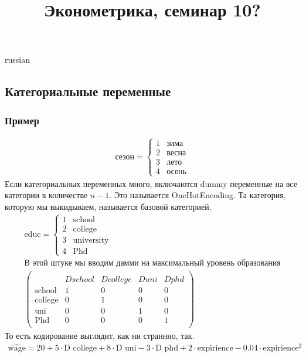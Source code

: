 \documentclass{article}
\begin{document}
\title{\foreignlanguage{russian}{Эконометрика, семинар 10?}}
\maketitle
\begin{otherlanguage*}{russian}
\subsection*{Категориальные переменные}
\subsubsection*{Пример}
\begin{align*}
\text{сезон} = 
\begin{cases} 
1 & \text{зима} \\ 
2 & \text{весна} \\ 
3 & \text{лето} \\ 
4 & \text{осень} 
\end{cases} 
\end{align*}
Если категориальных переменных много, включаются dummy переменные на все категории в количестве $ n - 1 $. Это называется OneHotEncoding. Та категория, которую мы выкидываем, называется базовой категорией.  
\begin{align*}
\text{educ} = \begin{cases} 1 & \text{school} \\ 2 & \text{college} \\ 3 & \text{university} \\ 4 & \text{Phd} \end{cases} \\
\text{В этой штуке мы вводим дамми на максимальный уровень образования} \\ 
\begin{pmatrix} \\
 & Dschool & Dcollege & Duni & Dphd \\
\text{school} & 1 & 0 & 0 & 0 \\
\text{college} & 0 & 1 & 0 & 0 \\
\text{uni} & 0 & 0 & 1 & 0 \\
\text{Phd} & 0 & 0 & 0 & 1 \\
\end{pmatrix}
\end{align*}
То есть кодирование выглядит, как ни страннно, так. 
\begin{align*}
\widehat{\text{wage}} = 20  + 5 \cdot \text{D college} + 8 \cdot \text{D uni} - 3 \cdot \text{D phd} + 2 \cdot \text{expirience} - 0.04 \cdot \text{expirience} ^ 2  

\end{align*}
\end{otherlanguage*}
\end{document}
